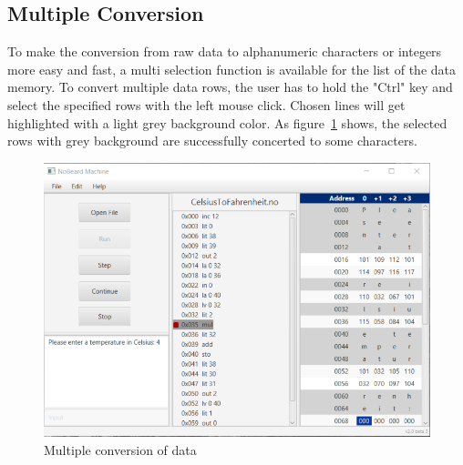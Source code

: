 \subsection{Multiple Conversion}
To make the conversion from raw data to alphanumeric characters or integers more easy and fast, a multi selection function is available for the list of the data memory.
To convert multiple data rows, the user has to hold the "Ctrl" key and select the specified rows with the left mouse click. Chosen lines will get highlighted with a light grey background color. As figure~\ref{fig:multipleConversion} shows, the selected rows with grey background are successfully concerted to some characters.
\begin{figure}[h] 
	\centering
	\includegraphics[scale=.85]{images/screenshot-5.png}
	\caption{Multiple conversion of data}
	\label{fig:multipleConversion}
\end{figure}
